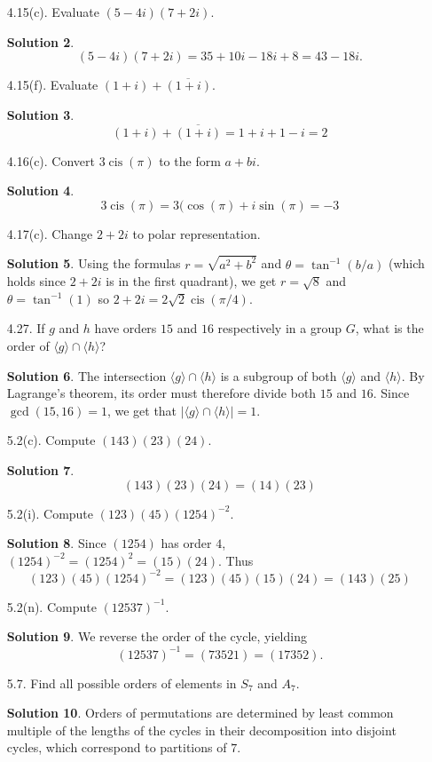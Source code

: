 \documentclass{article}
\DeclareMathOperator{\cis}{cis}
\theoremstyle{definition}
\newtheorem*{solution}{Solution}
\begin{document}
\begin{enumerate}
\begin{solution}
\begin{itemize}
\end{itemize}
\end{solution}
\item[4.15(c).] Evaluate $(5 - 4i)(7+2i)$.
\begin{solution}
\[
(5 - 4i)(7+2i) = 35  + 10i - 18i +8 = 43 - 18i.
\]
\end{solution}
\item[4.15(f).] Evaluate $(1+i) + \overline{(1 + i)}$.
\begin{solution}
\[
(1+i) + \overline{(1 + i)} = 1 + i + 1 - i = 2
\]
\end{solution}
\item[4.16(c).] Convert $3\cis(\pi)$ to the form $a + bi$.
\begin{solution}
\[
3\cis(\pi) = 3(\cos(\pi) + i\sin(\pi) = -3
\]
\end{solution}
\item[4.17(c).] Change $2 + 2i$ to polar representation.
\begin{solution}
Using the formulas $r = \sqrt{a^2 + b^2}$ and $\theta = \tan^{-1}(b/a)$ (which holds since $2+2i$ is in the first quadrant), we get $r = \sqrt{8}$ and $\theta = \tan^{-1}(1)$ so $2 + 2i = 2\sqrt{2}\cis(\pi/4)$.
\end{solution}
\item[4.27.] If $g$ and $h$ have orders $15$ and $16$ respectively in a group $G$, what is the order of $\langle g \rangle \cap \langle h \rangle$?
\begin{solution}
The intersection $\langle g \rangle \cap \langle h \rangle$ is a subgroup of both $\langle g \rangle$ and $\langle h \rangle$.  By Lagrange's theorem, its order must therefore divide both $15$ and $16$.  Since $\gcd(15,16) = 1$, we get that $\lvert \langle g \rangle \cap \langle h \rangle \rvert = 1$.
\end{solution}
\item[5.2(c).] Compute $(143)(23)(24)$.
\begin{solution}
\[
(143)(23)(24) = (14)(23)
\]
\end{solution}
\item[5.2(i).] Compute $(123)(45)(1254)^{-2}$.
\begin{solution}
Since $(1254)$ has order $4$, $(1254)^{-2} = (1254)^2 = (15)(24).$ Thus
\[
(123)(45)(1254)^{-2} = (123)(45)(15)(24) = (143)(25)
\]
\end{solution}
\item[5.2(n).] Compute $(12537)^{-1}$.
\begin{solution}
We reverse the order of the cycle, yielding
\[
(12537)^{-1} = (73521) = (17352).
\]
\end{solution}
\item[5.7.] Find all possible orders of elements in $S_7$ and $A_7$.
\begin{solution}
Orders of permutations are determined by least common multiple of the lengths of the cycles in their decomposition into disjoint cycles, which correspond to partitions of $7$.


\end{solution}
\end{enumerate}
\end{document}
